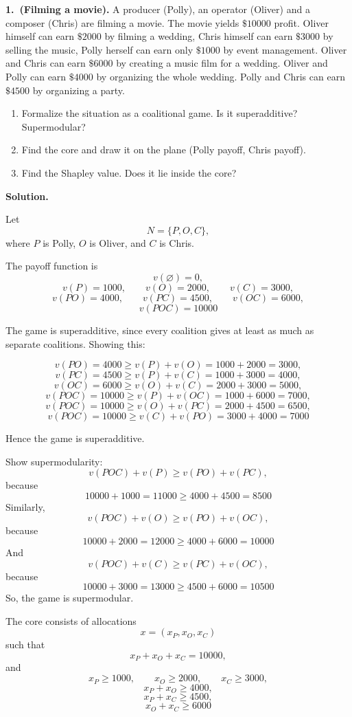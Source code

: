 \textbf{1.\ (Filming a movie).}
A producer (Polly), an operator (Oliver) and a composer (Chris) are filming a
movie. The movie yields \(\$10000\) profit. Oliver himself can earn \(\$2000\)
by filming a wedding, Chris himself can earn \(\$3000\) by selling the music,
Polly herself can earn only \(\$1000\) by event management. Oliver and Chris
can earn \(\$6000\) by creating a music film for a wedding. Oliver and Polly
can earn \(\$4000\) by organizing the whole wedding. Polly and Chris can earn
\(\$4500\) by organizing a party.

\begin{enumerate}
    \item[(a)] Formalize the situation as a coalitional game. Is it superadditive?
    Supermodular?
    \item[(b)] Find the core and draw it on the plane (Polly payoff, Chris payoff).
    \item[(c)] Find the Shapley value. Does it lie inside the core?
\end{enumerate}

\textbf{Solution.}

Let
\[
N=\{P,O,C\},
\]
where \(P\) is Polly, \(O\) is Oliver, and \(C\) is Chris.

The payoff function is
\[
v(\varnothing)=0,
\]
\[
v(P)=1000,\qquad v(O)=2000,\qquad v(C)=3000,
\]
\[
v(PO)=4000,\qquad v(PC)=4500,\qquad v(OC)=6000,
\]
\[
v(POC)=10000
\]

The game is superadditive, since every coalition gives at least as much
as separate coalitions. Showing this:

\[
v(PO)=4000\ge v(P)+v(O)=1000+2000=3000,
\]
\[
v(PC)=4500\ge v(P)+v(C)=1000+3000=4000,
\]
\[
v(OC)=6000\ge v(O)+v(C)=2000+3000=5000,
\]
\[
v(POC)=10000\ge v(P)+v(OC)=1000+6000=7000,
\]
\[
v(POC)=10000\ge v(O)+v(PC)=2000+4500=6500,
\]
\[
v(POC)=10000\ge v(C)+v(PO)=3000+4000=7000
\]


Hence the game is superadditive.


Show supermodularity:
\[
v(POC)+v(P)\ge v(PO)+v(PC),
\]
because
\[
10000+1000=11000\ge 4000+4500=8500
\]
Similarly,
\[
v(POC)+v(O)\ge v(PO)+v(OC),
\]
because
\[
10000+2000=12000\ge 4000+6000=10000
\]
And
\[
v(POC)+v(C)\ge v(PC)+v(OC),
\]
because
\[
10000+3000=13000\ge 4500+6000=10500
\]
So, the game is supermodular.


\medskip
The core consists of allocations
\[
x=(x_P,x_O,x_C)
\]
such that
\[
x_P+x_O+x_C=10000,
\]
and
\[
x_P\ge1000,\qquad x_O\ge2000,\qquad x_C\ge3000,
\]
\[
x_P+x_O\ge4000,
\]
\[
x_P+x_C\ge4500,
\]
\[
x_O+x_C\ge6000
\]

